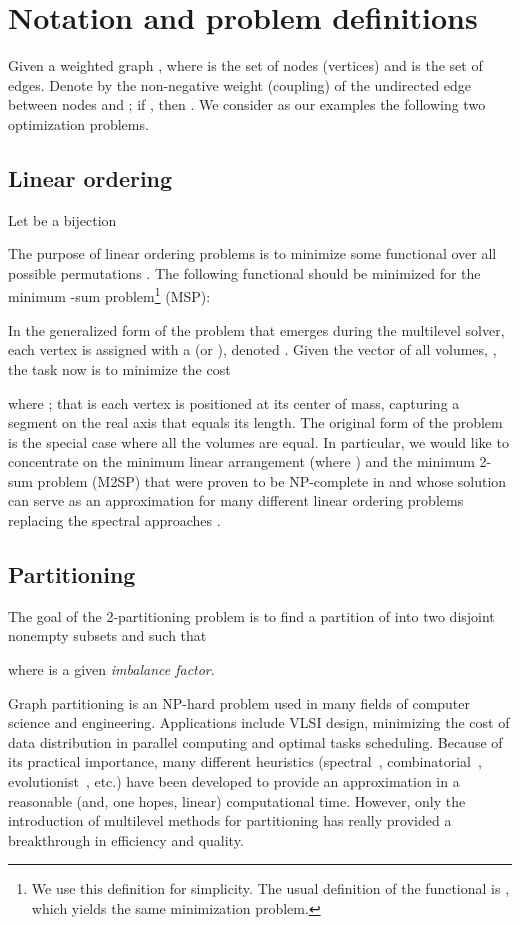 \documentclass[final]{siamltex}
\newcommand{\mtp}{minimum -sum problem}
\begin{document}
\section{Notation and problem definitions}\label{prob-def}
\par Given a weighted graph , where 
is the set of nodes (vertices) and  is the set of edges.
Denote by  the non-negative weight (coupling)
of the undirected edge  between nodes  and ; if
, then . We consider as our examples the following two optimization problems.
\subsection{Linear ordering}
Let  be a bijection

The purpose of linear ordering problems is to minimize some functional over all possible permutations . The following functional should be minimized for the {\mtp}\footnote{We use this definition for simplicity. The usual definition of the functional is , which yields the same minimization problem.} (MSP):

 In the generalized form of the problem that emerges during the multilevel solver, each vertex  is assigned with a  (or ), denoted . Given the vector of all volumes, , the task now is to minimize the cost
 
where \mbox{}; that is each vertex is positioned at its center of mass, capturing a segment on the real axis that equals its length. The original form of the problem is the special case where all the volumes are equal. In particular, we would like to concentrate on the minimum linear arrangement (where ) and the minimum 2-sum problem (M2SP) that were proven to be NP-complete in \cite{gjs,georgepothen} and whose solution can serve as an approximation for many different linear ordering problems replacing the spectral approaches \cite{safro2004,safro2005}.
\subsection{Partitioning}
\par The goal of the 2-partitioning problem is to find a partition of  into two disjoint nonempty subsets  and  such that

where  is a given {\it imbalance factor}.
\par Graph partitioning is an NP-hard problem \cite{Garey79} used in many fields of
computer science and engineering. Applications include VLSI
design, minimizing the cost of data distribution in parallel
computing and optimal tasks scheduling. Because of its practical
importance, many different heuristics (spectral~\cite{posili90}, combinatorial~\cite{keli70,fima82},
evolutionist~\cite{buiMoon96}, etc.) have been developed to
provide an approximation in a reasonable (and, one hopes, linear)
computational time. However, only the introduction of multilevel
methods for partitioning
\cite{metis,webscotch,alpert97multilevel,MeyerhenkeMonienSauerwald08new,Walshaw-AoOR-04,evo03proc,doritpart,barnard94fast,hendrickson95multilevel,kaku95a,Abou-RjeiliK06}
has really provided a breakthrough in efficiency and quality.
\end{document}
